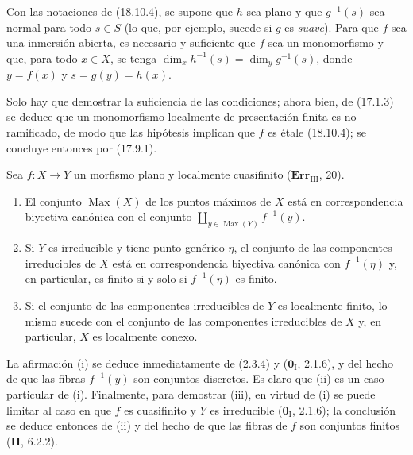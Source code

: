 \begin{corollary}[18.10.5]
\label{IV.18.10.5}
Con las notaciones de \textup{(18.10.4)}, se supone que $h$ sea plano y que $g^{-1}(s)$ sea normal para todo $s\in S$ \textup{(lo que, por ejemplo, sucede si $g$ es \emph{suave})}. Para que $f$ sea una inmersión abierta, es necesario y suficiente que $f$ sea un monomorfismo y que, para todo $x\in X$, se tenga $\dim_xh^{-1}(s)=\dim_yg^{-1}(s)$, donde $y=f(x)$ y $s=g(y)=h(x)$.
\end{corollary}

Solo hay que demostrar la suficiencia de las condiciones; ahora bien, de (17.1.3) se deduce que un monomorfismo localmente de presentación finita es no ramificado, de modo que las hipótesis implican que $f$ es étale (18.10.4); se concluye entonces por (17.9.1).

\begin{lemma}[18.10.6]
\label{IV.18.10.6}
Sea $f:X\to Y$ un morfismo plano y localmente cuasifinito \textup{($\mathbf{Err}_{\mathrm{III}}$, 20)}.
\begin{enumerate}
  \item[\textup{(i)}] El conjunto $\operatorname{Max}(X)$ de los puntos máximos de $X$ está en correspondencia biyectiva canónica con el conjunto $\coprod_{y\in\operatorname{Max}(Y)}f^{-1}(y)$.
  \item[\textup{(ii)}] Si $Y$ es irreducible y tiene punto genérico $\eta$, el conjunto de las componentes irreducibles de $X$ está en correspondencia biyectiva canónica con $f^{-1}(\eta)$ y, en particular, es finito si y solo si $f^{-1}(\eta)$ es finito.


  \item[\textup{(iii)}] Si el conjunto de las componentes irreducibles de $Y$ es localmente finito, lo mismo sucede con el conjunto de las componentes irreducibles de $X$ y, en particular, $X$ es localmente conexo.
\end{enumerate}
\end{lemma}

La afirmación (i) se deduce inmediatamente de (2.3.4) y ($\mathbf{0}_{\mathrm I}$, 2.1.6), y del hecho de que las fibras $f^{-1}(y)$ son conjuntos discretos. Es claro que (ii) es un caso particular de (i). Finalmente, para demostrar (iii), en virtud de (i) se puede limitar al caso en que $f$ es cuasifinito y $Y$ es irreducible ($\mathbf{0}_{\mathrm I}$, 2.1.6); la conclusión se deduce entonces de (ii) y del hecho de que las fibras de $f$ son conjuntos finitos (\textbf{II}, 6.2.2).

